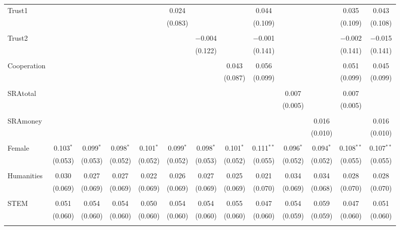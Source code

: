 \begin{subtables}
\begin{table}[H]
\begin{adjustbox}{width=\textwidth}
\begin{tabular}{@{\extracolsep{5pt}}lcccccccccccc}
 Trust1 &  &  &  &  & 0.024 &  &  & 0.044 &  &  & 0.035 & 0.043 \\ 
  &  &  &  &  & (0.083) &  &  & (0.109) &  &  & (0.109) & (0.108) \\ 
  & & & & & & & & & & & & \\ 
 Trust2 &  &  &  &  &  & $-$0.004 &  & $-$0.001 &  &  & $-$0.002 & $-$0.015 \\ 
  &  &  &  &  &  & (0.122) &  & (0.141) &  &  & (0.141) & (0.141) \\ 
  & & & & & & & & & & & & \\ 
 Cooperation &  &  &  &  &  &  & 0.043 & 0.056 &  &  & 0.051 & 0.045 \\ 
  &  &  &  &  &  &  & (0.087) & (0.099) &  &  & (0.099) & (0.099) \\ 
  & & & & & & & & & & & & \\ 
 SRAtotal &  &  &  &  &  &  &  &  & 0.007 &  & 0.007 &  \\ 
  &  &  &  &  &  &  &  &  & (0.005) &  & (0.005) &  \\ 
  & & & & & & & & & & & & \\ 
 SRAmoney &  &  &  &  &  &  &  &  &  & 0.016 &  & 0.016 \\ 
  &  &  &  &  &  &  &  &  &  & (0.010) &  & (0.010) \\ 
  & & & & & & & & & & & & \\ 
 Female & 0.103$^{*}$ & 0.099$^{*}$ & 0.098$^{*}$ & 0.101$^{*}$ & 0.099$^{*}$ & 0.098$^{*}$ & 0.101$^{*}$ & 0.111$^{**}$ & 0.096$^{*}$ & 0.094$^{*}$ & 0.108$^{**}$ & 0.107$^{**}$ \\ 
  & (0.053) & (0.053) & (0.052) & (0.052) & (0.052) & (0.053) & (0.052) & (0.055) & (0.052) & (0.052) & (0.055) & (0.055) \\ 
  & & & & & & & & & & & & \\ 
 Humanities & 0.030 & 0.027 & 0.027 & 0.022 & 0.026 & 0.027 & 0.025 & 0.021 & 0.034 & 0.034 & 0.028 & 0.028 \\ 
  & (0.069) & (0.069) & (0.069) & (0.069) & (0.069) & (0.069) & (0.069) & (0.070) & (0.069) & (0.068) & (0.070) & (0.070) \\ 
  & & & & & & & & & & & & \\ 
 STEM & 0.051 & 0.054 & 0.054 & 0.050 & 0.054 & 0.054 & 0.055 & 0.047 & 0.054 & 0.059 & 0.047 & 0.051 \\ 
  & (0.060) & (0.060) & (0.060) & (0.060) & (0.060) & (0.060) & (0.060) & (0.060) & (0.059) & (0.059) & (0.060) & (0.060) \\ 
  & & & & & & & & & & & & \\ 

\end{tabular}
\end{adjustbox}
\end{table}
\end{subtables}
